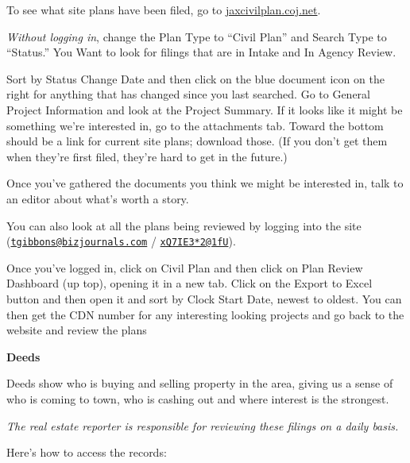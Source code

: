 \documentclass[
  11pt,
  american,
  letterpaperpaper,
  extrafontsizes,onecolumn,openright
  ]{memoir}
\begin{document}
To see what site plans have been filed, go to \href{https://jaxcivilplan.coj.net/}{jaxcivilplan.coj.net}.

\emph{Without logging in}, change the Plan Type to \enquote{Civil Plan} and Search Type to \enquote{Status.} You Want to look for filings that are in Intake and In Agency Review.

Sort by Status Change Date and then click on the blue document icon on the right for anything that has changed since you last searched. Go to General Project Information and look at the Project Summary. If it looks like it might be something we're interested in, go to the attachments tab. Toward the bottom should be a link for current site plans; download those. (If you don't get them when they're first filed, they're hard to get in the future.)

Once you've gathered the documents you think we might be interested in, talk to an editor about what's worth a story.

You can also look at all the plans being reviewed by logging into the site (\href{mailto:tgibbons@bizjournals.com}{\nolinkurl{tgibbons@bizjournals.com}} / \href{mailto:xQ7IE3*2@1fU}{\nolinkurl{xQ7IE3*2@1fU}}).

Once you've logged in, click on Civil Plan and then click on Plan Review Dashboard (up top), opening it in a new tab. Click on the Export to Excel button and then open it and sort by Clock Start Date, newest to oldest. You can then get the CDN number for any interesting looking projects and go back to the website and review the plans

\textbf{Deeds}

Deeds show who is buying and selling property in the area, giving us a sense of who is coming to town, who is cashing out and where interest is the strongest.

\emph{The real estate reporter is responsible for reviewing these filings on a daily basis.}

Here's how to access the records:
\end{document}

